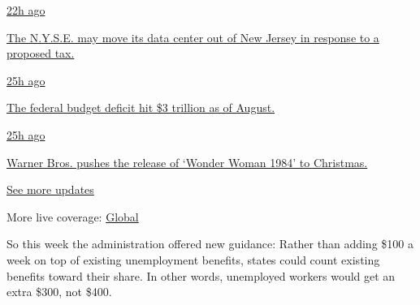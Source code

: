 \href{https://www.nytimes3xbfgragh.onion/live/2020/09/11/business/stock-market-today-coronavirus?action=click\&pgtype=Article\&state=default\&region=MAIN_CONTENT_1\&context=storylines_live_updates\#the-nyse-may-move-its-data-center-out-of-new-jersey-in-response-to-a-proposed-tax}{22h
ago}

\href{https://www.nytimes3xbfgragh.onion/live/2020/09/11/business/stock-market-today-coronavirus?action=click\&pgtype=Article\&state=default\&region=MAIN_CONTENT_1\&context=storylines_live_updates\#the-nyse-may-move-its-data-center-out-of-new-jersey-in-response-to-a-proposed-tax}{The
N.Y.S.E. may move its data center out of New Jersey in response to a
proposed tax.}

\href{https://www.nytimes3xbfgragh.onion/live/2020/09/11/business/stock-market-today-coronavirus?action=click\&pgtype=Article\&state=default\&region=MAIN_CONTENT_1\&context=storylines_live_updates\#the-federal-budget-deficit-hit-3-trillion-as-of-august}{25h
ago}

\href{https://www.nytimes3xbfgragh.onion/live/2020/09/11/business/stock-market-today-coronavirus?action=click\&pgtype=Article\&state=default\&region=MAIN_CONTENT_1\&context=storylines_live_updates\#the-federal-budget-deficit-hit-3-trillion-as-of-august}{The
federal budget deficit hit \$3 trillion as of August.}

\href{https://www.nytimes3xbfgragh.onion/live/2020/09/11/business/stock-market-today-coronavirus?action=click\&pgtype=Article\&state=default\&region=MAIN_CONTENT_1\&context=storylines_live_updates\#warner-bros-pushes-the-release-of-wonder-woman-1984-to-christmas}{25h
ago}

\href{https://www.nytimes3xbfgragh.onion/live/2020/09/11/business/stock-market-today-coronavirus?action=click\&pgtype=Article\&state=default\&region=MAIN_CONTENT_1\&context=storylines_live_updates\#warner-bros-pushes-the-release-of-wonder-woman-1984-to-christmas}{Warner
Bros. pushes the release of `Wonder Woman 1984' to Christmas.}

\href{https://www.nytimes3xbfgragh.onion/live/2020/09/11/business/stock-market-today-coronavirus?action=click\&pgtype=Article\&state=default\&region=MAIN_CONTENT_1\&context=storylines_live_updates}{See
more updates}

More live coverage:
\href{https://www.nytimes3xbfgragh.onion/2020/09/11/world/covid-19-coronavirus.html?action=click\&pgtype=Article\&state=default\&region=MAIN_CONTENT_1\&context=storylines_live_updates}{Global}

So this week the administration offered new guidance: Rather than adding
\$100 a week on top of existing unemployment benefits, states could
count existing benefits toward their share. In other words, unemployed
workers would get an extra \$300, not \$400.

